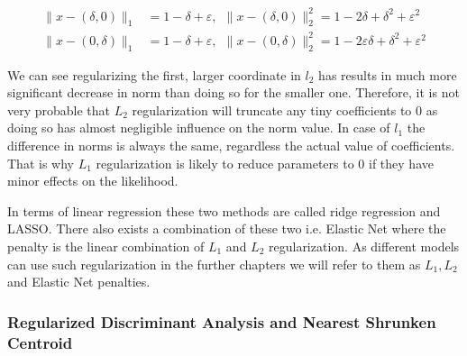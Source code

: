 \documentclass[12pt, wide]{mwart}
\begin{document}
\begin{align*}
    \|x-(\delta, 0)\|_{1}&=1-\delta+\varepsilon, \ \   \|x-(\delta, 0)\|_{2}^{2}=1-2 \delta+\delta^{2}+\varepsilon^{2} \\ 
    \|x-(0, \delta)\|_{1}&=1-\delta+\varepsilon, \ \  \|x-(0, \delta)\|_{2}^{2}=1-2 \varepsilon \delta+\delta^{2}+\varepsilon^{2}
\end{align*}

We can see regularizing the first, larger coordinate in $l_2$ has results in much more significant decrease in norm than doing so for the smaller one. Therefore, it is not very probable that $L_2$ regularization will truncate any tiny coefficients to $0$ as doing so has almost negligible influence on the norm value. In case of $l_1$ the difference in norms is always the same, regardless the actual value of coefficients. That is why $L_1$ regularization is likely to reduce parameters to $0$ if they have minor effects on the likelihood. 

In terms of linear regression these two methods are called ridge regression and LASSO. There also exists a combination of these two i.e. Elastic Net where the penalty is the linear combination of $L_1$ and $L_2$ regularization. As different models can use such regularization in the further chapters we will refer to them as $L_1, L_2$ and Elastic Net penalties.

\subsubsection{Regularized Discriminant Analysis and Nearest Shrunken Centroid}
\end{document}
